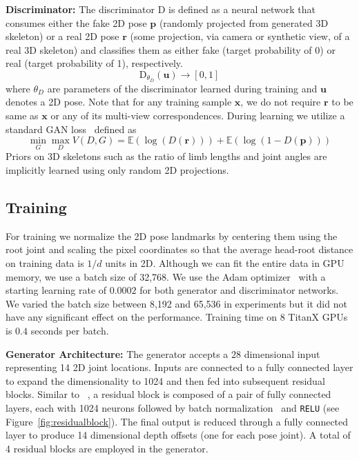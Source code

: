 \documentclass[runningheads]{llncs}
\begin{document}
\textbf{Discriminator:} The discriminator $\textrm{D}$ is defined as a neural network that consumes either the fake 2D pose $\textbf{p}$ (randomly projected from generated 3D skeleton) or a real 2D pose $\textbf{r}$ (some projection, via camera or synthetic view, of a real 3D skeleton) and classifies them as either fake (target probability of 0) or real (target probability of 1), respectively.
\begin{equation}
\textrm{D}_{\theta_D} (\textbf{u})\rightarrow [0,1]
\end{equation}
where $\theta_D$ are parameters of the discriminator learned during training and $\textbf{u}$ denotes a 2D pose. Note that for any training sample $\textbf{x}$, we do {not} require $\textbf{r}$ to be same as $\textbf{x}$ or any of its multi-view correspondences. During learning we utilize a standard GAN loss~\cite{GAN} defined as
\begin{equation}
\min_G \max_D V(D,G) = \mathbb{E}(\log(D(\textbf{r}))) + \mathbb{E}(\log(1-D(\textbf{p})))
\end{equation}
Priors on 3D skeletons such as the ratio of limb lengths and joint angles are implicitly learned using only random 2D projections.

\subsection{Training}\label{sect:training}
For training we normalize the 2D pose landmarks by centering them using the root joint and scaling the pixel coordinates so that the average head-root distance on training data is $1/d$ units in 2D. Although we can fit the entire data in GPU memory, we use a batch size of 32,768. We use the Adam optimizer~\cite{KingmaB14} with a starting learning rate of $0.0002$ for both generator and discriminator networks. We varied the batch size between 8,192 and 65,536 in experiments but it did not have any significant effect on the performance. Training time on $8$ TitanX GPUs is $0.4$ seconds per batch.

\textbf{Generator Architecture:} The generator accepts a $28$ dimensional input representing 14 2D joint locations. Inputs are connected to a fully connected layer to expand the dimensionality to 1024 and then fed into subsequent residual blocks. Similar to ~\cite{MartinezICCV2017}, a residual block is composed of a pair of fully connected layers, each with 1024 neurons followed by batch normalization~\cite{Ioffe2015BN} and \texttt{RELU} (see Figure~\ref{fig:residualblock}). The final output is reduced through a fully connected layer to produce 14 dimensional depth offsets (one for each pose joint). A total of 4 residual blocks are employed in the generator. 
\end{document}
